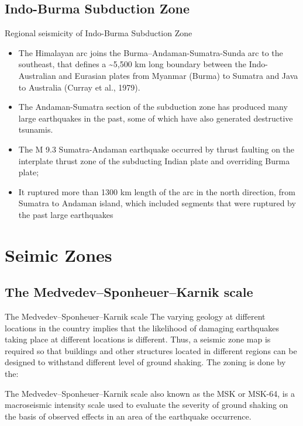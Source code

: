 \documentclass[smaller]{beamer}
\begin{document}
\subsection{Indo-Burma Subduction Zone}
\begin{frame}{Regional  seismicity of Indo-Burma Subduction Zone}
\begin{itemize}
\item The Himalayan arc joins the Burma--Andaman-Sumatra-Sunda arc to the southeast, that defines a \~{}5,500 km long boundary between the Indo-Australian and Eurasian plates from Myanmar (Burma) to Sumatra and Java to Australia (Curray et al., 1979).
\item The Andaman-Sumatra section of the subduction zone has produced many large earthquakes in the past, some of which have also generated destructive tsunamis.
\item The M 9.3 Sumatra-Andaman earthquake occurred by thrust faulting on the interplate thrust zone of the subducting Indian plate and overriding Burma plate; 
\item It ruptured more than 1300 km length of the arc in the north direction, from Sumatra to Andaman island, which included segments that were ruptured by the past large earthquakes
\end{itemize}
\end{frame}
\section{Seimic Zones }
\subsection{The Medvedev–Sponheuer–Karnik scale}
\begin{frame}{The Medvedev–Sponheuer–Karnik scale}
The varying geology at different locations in the country implies that the likelihood of damaging earthquakes
taking place at different locations is different. Thus, a seismic zone map is required so that buildings and other
structures located in different regions can be designed to withstand different level of ground shaking.
The zoning is done by the:
\begin{block}{The Medvedev–Sponheuer–Karnik scale}
 also known as the MSK or MSK-64, is a macroseismic intensity scale used to evaluate the severity of ground shaking on the basis of observed effects in an area of the earthquake occurrence.
\end{block}
\end{frame}
\end{document}
